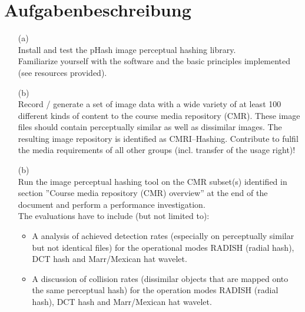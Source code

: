 \section{Aufgabenbeschreibung}
\label{sec:appendix_a}
\begin{enumerate}
	\item[\boldT (a)] \\
	Install and test the pHash image perceptual hashing library.\\
	Familiarize yourself with the software and the basic principles implemented (see resources provided).	%
	\item[\boldT (b)] \\
	Record / generate a set of image data with a wide variety of at least 100 different kinds of content to the course
	media repository (CMR). These image files should contain perceptually similar as well as dissimilar images. The
	resulting image repository is identified as CMR{I--Hashing}. Contribute to fulfil the media requirements of all
	other groups (incl. transfer of the usage right)!
	\item[\boldT (b)] \\
	Run the image perceptual hashing tool on the CMR subset(s) identified in section ''Course media repository (CMR)
	overview'' at the end of the document and perform a performance investigation.\\
	The evaluations have to include (but not limited to):
	\begin{itemize}[noitemsep]
		\item A analysis of achieved detection rates (especially on perceptually similar but not identical files)
		for the operational modes RADISH (radial hash), DCT hash and Marr/Mexican hat wavelet.
		\item A discussion of collision rates (dissimilar objects that are mapped onto the same perceptual hash)
		for the operation modes RADISH (radial hash), DCT hash and Marr/Mexican hat wavelet.

\end{itemize}
\end{enumerate}
